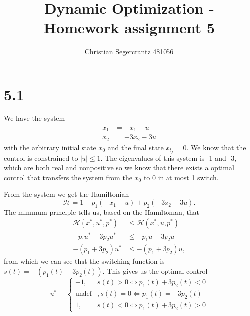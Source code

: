 \documentclass{article}
\title{Dynamic Optimization - Homework assignment 5}
\author{Christian Segercrantz 481056}
\begin{document}
	\maketitle
	\pagebreak

\section*{5.1}

We have the system
\begin{align}
	\dot{x}_1 &= -x_1 - u\\
	\dot{x}_2 &= -3x_2 -3u
\end{align}
with the arbitrary initial state $x_0$ and the final state $x_{t_f}=0$. We know that the control is constrained to $|u| \leq 1$. The eigenvalues of this system is -1 and -3, which are both real and nonpositive so we know that there exists a optimal control that transfers the system from the $x_0$ to 0 in at most 1 switch.  

From the system we get the Hamiltonian
\begin{equation}
	\mathcal{H} = 1 + p_1(-x_1-u) + p_2(-3x_2-3u).
\end{equation} 
The minimum principle tells us, based on the Hamiltonian, that\\
\begin{align}
	\mathcal{H}(x^*,u^*,p^*) &\leq \mathcal{H}(x^*,u,p^*)\\
	-p_1 u^*  -3p_2u^* &\leq -p_1 u  -3p_2u\\
	-(p_1 + 3p_2)u^* &\leq -(p_1 + 3p_2)u,
\end{align}
from which we can see that the switching function is $s(t) = -(p_1(t) + 3p_2(t))$. This gives us the optimal control
\begin{equation}
	u^* = 
	\begin{cases}
		-1, &s(t)>0 \iff p_1(t) + 3p_2(t) <0 \\
		\text{undef} &, s(t) = 0 \iff p_1(t) = -3p_2(t) \\
		1, &s(t)<0 \iff p_1(t) + 3p_2(t) > 0
	\end{cases}
\end{equation}
\end{document}
